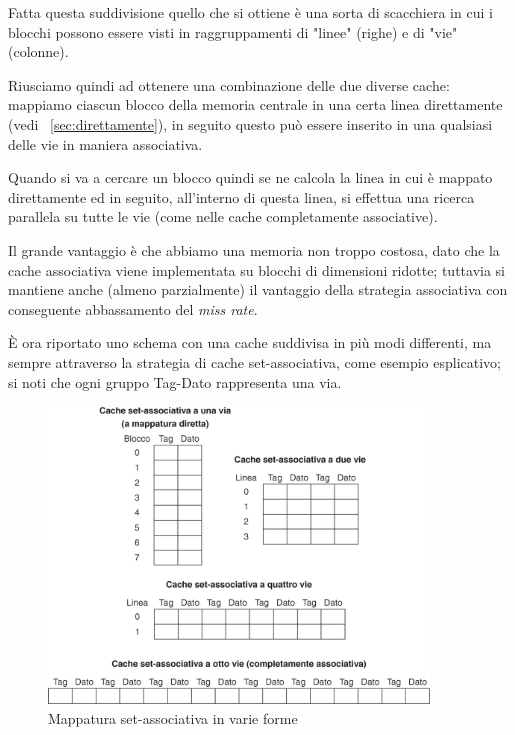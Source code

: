 \documentclass[class=book, crop=false, oneside]{standalone}
\begin{document}
Fatta questa suddivisione quello che si ottiene è una sorta di scacchiera in cui i blocchi possono essere visti in raggruppamenti di "linee" (righe) e di "vie" (colonne).

Riusciamo quindi ad ottenere una combinazione delle due diverse cache: mappiamo ciascun blocco della memoria centrale in una certa linea direttamente (vedi ~\ref{sec:direttamente}), in seguito questo può essere inserito in una qualsiasi delle vie in maniera associativa.


Quando si va a cercare un blocco quindi se ne calcola la linea in cui è mappato direttamente ed in seguito, all'interno di questa linea, si effettua una ricerca parallela su tutte le vie (come nelle cache completamente associative).

Il grande vantaggio è che abbiamo una memoria non troppo costosa, dato che la cache associativa viene implementata su blocchi di dimensioni ridotte; tuttavia si mantiene anche (almeno parzialmente) il vantaggio della strategia associativa con conseguente abbassamento del \emph{miss rate}.

È ora riportato uno schema con una cache suddivisa in più modi differenti, ma sempre attraverso la strategia di cache set-associativa, come esempio esplicativo; si noti che ogni gruppo Tag-Dato rappresenta una via.

\begin{figure}[H]
	\centering
	\includegraphics[width=0.9\textwidth,keepaspectratio]{mappatura-set-associativa}
	\caption{Mappatura set-associativa in varie forme}
\end{figure}
\end{document}

